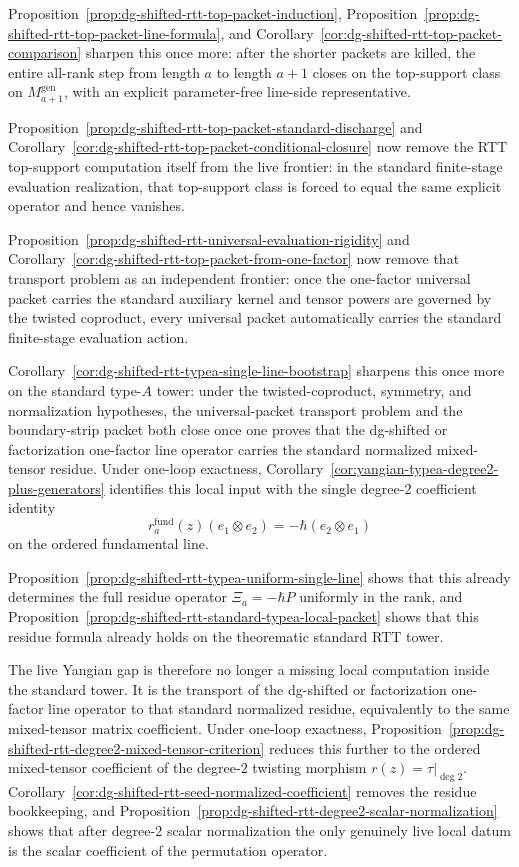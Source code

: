 \begin{remark}
\begin{remark}
Proposition~\ref{prop:dg-shifted-rtt-top-packet-induction},
Proposition~\ref{prop:dg-shifted-rtt-top-packet-line-formula}, and
Corollary~\ref{cor:dg-shifted-rtt-top-packet-comparison} sharpen this
once more: after the shorter packets are killed, the entire all-rank
step from length $a$ to length $a+1$ closes on the top-support class on
$M_{a+1}^{\mathrm{gen}}$, with an explicit parameter-free line-side
representative.

Proposition~\ref{prop:dg-shifted-rtt-top-packet-standard-discharge}
and
Corollary~\ref{cor:dg-shifted-rtt-top-packet-conditional-closure}
now remove the RTT top-support computation itself from the live
frontier: in the standard finite-stage evaluation realization, that
top-support class is forced to equal the same explicit operator and
hence vanishes.

Proposition~\ref{prop:dg-shifted-rtt-universal-evaluation-rigidity}
and
Corollary~\ref{cor:dg-shifted-rtt-top-packet-from-one-factor}
now remove that transport problem as an independent frontier: once the
one-factor universal packet carries the standard auxiliary kernel and
tensor powers are governed by the twisted coproduct, every universal
packet automatically carries the standard finite-stage evaluation
action.

Corollary~\ref{cor:dg-shifted-rtt-typea-single-line-bootstrap}
sharpens this once more on the standard type-$A$ tower: under the
twisted-coproduct, symmetry, and normalization hypotheses, the
universal-packet transport problem and the boundary-strip packet both
close once one proves that the dg-shifted or factorization one-factor
line operator carries the standard normalized mixed-tensor residue.
Under one-loop exactness,
Corollary~\ref{cor:yangian-typea-degree2-plus-generators} identifies
this local input with the single degree-$2$ coefficient identity
\[
r_a^{\mathrm{fund}}(z)(e_1\otimes e_2)
=
-\hbar(e_2\otimes e_1)
\]
on the ordered fundamental line.

Proposition~\ref{prop:dg-shifted-rtt-typea-uniform-single-line}
shows that this already determines the full residue operator
$\Xi_a=-\hbar P$ uniformly in the rank, and
Proposition~\ref{prop:dg-shifted-rtt-standard-typea-local-packet}
shows that this residue formula already holds on the theorematic
standard RTT tower.

The live Yangian gap is therefore no longer a missing local
computation inside the standard tower.  It is the transport of the
dg-shifted or factorization one-factor line operator to that standard
normalized residue, equivalently to the same mixed-tensor matrix
coefficient.  Under one-loop exactness,
Proposition~\ref{prop:dg-shifted-rtt-degree2-mixed-tensor-criterion}
reduces this further to the ordered mixed-tensor coefficient of the
degree-$2$ twisting morphism $r(z)=\tau|_{\deg 2}$.
Corollary~\ref{cor:dg-shifted-rtt-seed-normalized-coefficient}
removes the residue bookkeeping, and
Proposition~\ref{prop:dg-shifted-rtt-degree2-scalar-normalization}
shows that after degree-$2$ scalar normalization the only genuinely
live local datum is the scalar coefficient of the permutation
operator.


\end{remark}
\end{remark}
